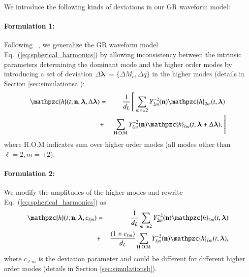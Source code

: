 \documentclass[prd,preprintnumbers,twocolumn,eqsecnum,floatfix,a4paper,nofootinbib,superscriptaddress]{revtex4}
\newcommand{\h}{\mathpzc{h}}
\newcommand{\hlm}{\mathpzc{h}_{\ell m}}
\newcommand{\Ylm}{{Y}^{-2}_{\ell m}}
\newcommand{\blambda}{\bm{\lambda}}
\newcommand{\n}{\mathbf{n}}
\begin{document}

We introduce the following kinds of deviations in our GR waveform model: 

\paragraph{Formulation 1:}
	Following ~\cite{dhanpal2018}, we generalize the GR waveform model Eq.~(\ref{eq:spherical_harmonics}) by allowing inconsistency between the intrinsic parameters determining the dominant mode and the higher order modes by introducing a set of deviation $\Delta \blambda := \{\Delta M_c, \Delta q\}$ in the higher modes (details in Section \ref{sec:simulationsa}):
	\begin{eqnarray}
	\h(t; \n, \blambda, \Delta \blambda) & = &  \frac{1}{d_L} \left[ ~ \sum_{m = \pm2} Y^{-2}_{2m} (\n) {\h}_{2m}(t, \blambda) \right. \nonumber \\ 
	& + & \left. \sum _{\text{H.O.M}} \Ylm (\n) \hlm(t, \blambda+\Delta \blambda), \right]
	\label{eq:test_1}
	\end{eqnarray}
where {H.O.M} indicates sum over higher order modes (all modes other than $\ell = 2, m = \pm 2$). 
	
\paragraph{Formulation 2:}
	We modify the amplitudes of the higher modes and rewrite Eq.~(\ref{eq:spherical_harmonics}) as
	\begin{eqnarray}
	{\h}(t; \n, \blambda, c_{\ell m}) & = & \frac{1}{d_L} \sum_{m = \pm2} Y^{-2}_{2m} (\n) {\h}_{2m}(t, \blambda)  \nonumber \\ 
	& + & \frac{(1+{c_{\ell m}})}{d_L} \sum _{\text{H.O.M}} \Ylm (\n) \hlm(t, \blambda),
	\label{eq:test_2}
	\end{eqnarray}
	where $c_{\ell m}$ is the deviation parameter and could be different for different higher order modes (details in Section \ref{sec:simulationsb}). 
	
\end{document}
